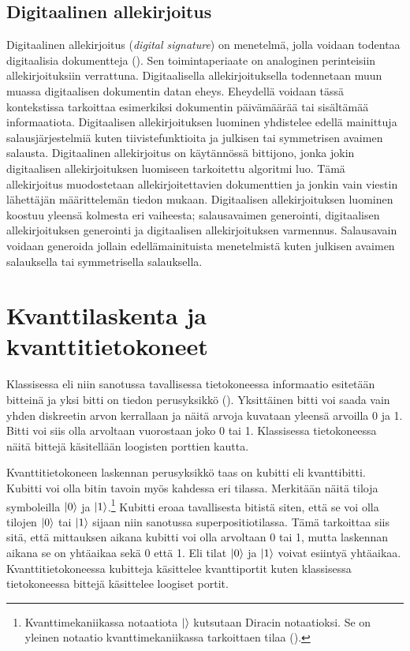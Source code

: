 \subsection{Digitaalinen allekirjoitus}
 Digitaalinen allekirjoitus (\emph{digital signature}) on menetelmä, jolla voidaan todentaa digitaalisia dokumentteja (\cite{1649003}). Sen toimintaperiaate on analoginen perinteisiin allekirjoituksiin verrattuna. Digitaalisella allekirjoituksella todennetaan muun muassa digitaalisen dokumentin datan eheys. Eheydellä voidaan tässä kontekstissa tarkoittaa esimerkiksi dokumentin päivämäärää tai sisältämää informaatiota. Digitaalisen allekirjoituksen luominen yhdistelee edellä mainittuja salausjärjestelmiä kuten tiivistefunktioita ja julkisen tai symmetrisen avaimen salausta. Digitaalinen allekirjoitus on käytännössä bittijono, jonka jokin digitaalisen allekirjoituksen luomiseen tarkoitettu algoritmi luo. Tämä allekirjoitus muodostetaan allekirjoitettavien dokumenttien ja jonkin vain viestin lähettäjän määrittelemän tiedon mukaan. Digitaalisen allekirjoituksen luominen koostuu yleensä kolmesta eri vaiheesta; salausavaimen generointi, digitaalisen allekirjoituksen generointi ja digitaalisen allekirjoituksen varmennus. Salausavain voidaan generoida jollain edellämainituista menetelmistä kuten julkisen avaimen salauksella tai symmetrisella salauksella.

\section{Kvanttilaskenta ja kvanttitietokoneet}
Klassisessa eli niin sanotussa tavallisessa tietokoneessa informaatio esitetään bitteinä ja yksi bitti on tiedon perusyksikkö (\cite{doi:10.1080/23742917.2016.1226650}). Yksittäinen bitti voi saada vain yhden diskreetin arvon kerrallaan ja näitä arvoja kuvataan yleensä arvoilla 0 ja 1. Bitti voi siis olla arvoltaan vuorostaan joko 0 tai 1. Klassisessa tietokoneessa näitä bittejä käsitellään loogisten porttien kautta.

Kvanttitietokoneen laskennan perusyksikkö taas on kubitti eli kvanttibitti. Kubitti voi olla bitin tavoin myös kahdessa eri tilassa. Merkitään näitä tiloja symboleilla
$\ket{0}$ ja $\ket{1}$.\footnote{Kvanttimekaniikassa notaatiota $\ket{}$ kutsutaan Diracin notaatioksi. Se on yleinen notaatio kvanttimekaniikassa tarkoittaen tilaa (\cite{nielsen2001quantum}).} Kubitti eroaa tavallisesta bitistä siten, että se voi olla tilojen $\ket{0}$ tai $\ket{1}$ sijaan niin sanotussa superpositiotilassa. Tämä tarkoittaa siis sitä, että mittauksen aikana kubitti voi olla arvoltaan 0 tai 1, mutta laskennan aikana se on yhtäaikaa sekä 0 että 1. Eli tilat $\ket{0}$ ja $\ket{1}$ voivat esiintyä yhtäaikaa. Kvanttitietokoneessa kubitteja käsittelee kvanttiportit kuten klassisessa tietokoneessa bittejä käsittelee loogiset portit.

